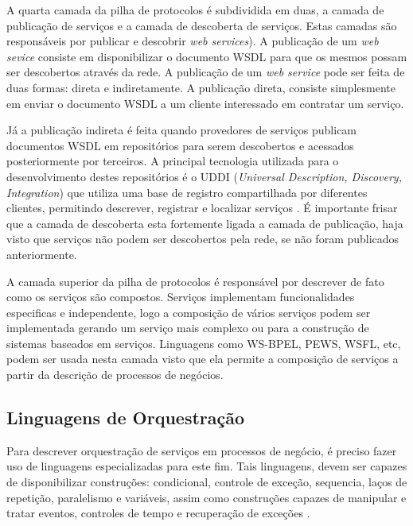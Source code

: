 A quarta camada da pilha de protocolos é subdividida em duas, a camada de publicação de serviços e a camada de descoberta de serviços. Estas camadas são responsáveis por publicar e descobrir \textit{web services}). A publicação de um \textit{web sevice} consiste em disponibilizar o documento WSDL para que os mesmos possam ser descobertos através da rede. A publicação de um \textit{web service} pode ser feita de duas formas: direta e indiretamente. A publicação direta, consiste simplesmente em enviar o documento WSDL a um cliente interessado em contratar um serviço. 

Já a publicação indireta é feita quando provedores de serviços publicam documentos WSDL em repositórios para serem descobertos e acessados posteriormente por terceiros. A principal tecnologia utilizada para o desenvolvimento destes repositórios é o UDDI (\textit{Universal Description, Discovery, Integration}) que utiliza uma base de registro compartilhada por diferentes clientes, permitindo descrever, registrar e localizar serviços \cite{W3Cwebservice}. É importante frisar que a camada de descoberta esta fortemente ligada a camada de publicação, haja visto que serviços não podem ser descobertos pela rede, se não foram publicados anteriormente.

A camada superior da pilha de protocolos é responsável por descrever de fato como os serviços são compostos. Serviços implementam funcionalidades especificas e independente, logo a composição de vários serviços podem ser implementada gerando um serviço mais complexo ou para a construção de sistemas baseados em serviços. Linguagens como WS-BPEL, PEWS, WSFL, etc, podem ser usada nesta camada visto que ela permite a composição de serviços a partir da descrição de processos de negócios.


\subsection{Linguagens de Orquestração}

Para descrever orquestração de serviços em processos de negócio, é preciso fazer uso de linguagens especializadas para este fim. Tais linguagens, devem ser capazes de disponibilizar construções: condicional, controle de exceção, sequencia, laços de repetição, paralelismo e variáveis, assim como construções capazes de manipular e tratar eventos, controles de tempo e recuperação de exceções \cite{BPEL20}. 

